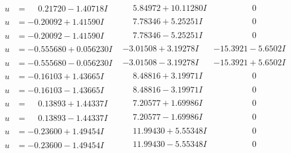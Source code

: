 \documentclass[1p]{elsarticle_modified}
\theoremstyle{definition}
\begin{document}
$$\begin{array}{c|c|c}
\begin{aligned}
u &= \phantom{-}0.21720 - 1.40718 I\end{aligned}
 & \phantom{-}5.84972 + 10.11280 I & \phantom{-0.000000 } 0 \\ \hline\begin{aligned}
u &= -0.20092 + 1.41590 I\end{aligned}
 & \phantom{-}7.78346 + 5.25251 I & \phantom{-0.000000 } 0 \\ \hline\begin{aligned}
u &= -0.20092 - 1.41590 I\end{aligned}
 & \phantom{-}7.78346 - 5.25251 I & \phantom{-0.000000 } 0 \\ \hline\begin{aligned}
u &= -0.555680 + 0.056230 I\end{aligned}
 & -3.01508 + 3.19278 I & -15.3921 - 5.6502 I \\ \hline\begin{aligned}
u &= -0.555680 - 0.056230 I\end{aligned}
 & -3.01508 - 3.19278 I & -15.3921 + 5.6502 I \\ \hline\begin{aligned}
u &= -0.16103 + 1.43665 I\end{aligned}
 & \phantom{-}8.48816 + 3.19971 I & \phantom{-0.000000 } 0 \\ \hline\begin{aligned}
u &= -0.16103 - 1.43665 I\end{aligned}
 & \phantom{-}8.48816 - 3.19971 I & \phantom{-0.000000 } 0 \\ \hline\begin{aligned}
u &= \phantom{-}0.13893 + 1.44337 I\end{aligned}
 & \phantom{-}7.20577 + 1.69986 I & \phantom{-0.000000 } 0 \\ \hline\begin{aligned}
u &= \phantom{-}0.13893 - 1.44337 I\end{aligned}
 & \phantom{-}7.20577 - 1.69986 I & \phantom{-0.000000 } 0 \\ \hline\begin{aligned}
u &= -0.23600 + 1.49454 I\end{aligned}
 & \phantom{-}11.99430 + 5.55348 I & \phantom{-0.000000 } 0 \\ \hline\begin{aligned}
u &= -0.23600 - 1.49454 I\end{aligned}
 & \phantom{-}11.99430 - 5.55348 I & \phantom{-0.000000 } 0 \\ \hline\begin{aligned}

\end{aligned}
\end{array}$$
\end{document}
